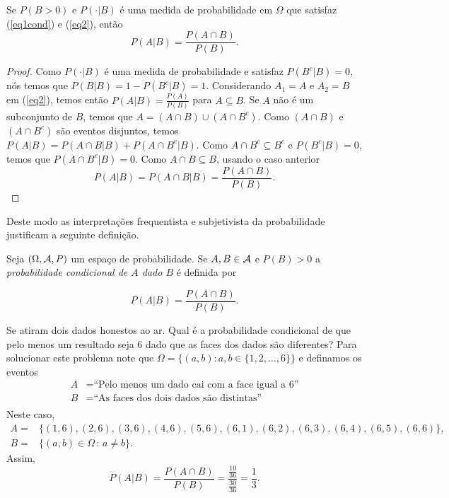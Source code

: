 \begin{frame}

	\begin{theorem}
		Se $P(B>0)$ e $P(\cdot|B)$ é uma medida de probabilidade em $\Omega$
		que satisfaz (\ref{eq1cond}) e (\ref{eq2}), então
		$$P(A|B)=\frac{P(A\cap B)}{P(B)}.$$
	\end{theorem}
	
	\begin{proof} Como $P(\cdot|B)$ é uma medida de probabilidade e satisfaz
	$P(B^c|B)=0$, nós temos que $P(B|B)=1-P(B^c|B)=1$. Considerando
	$A_1=A$ e $A_2=B$ em (\ref{eq2}), temos então
	$P(A|B)=\frac{P(A)}{P(B)}$ para $A\subseteq B$. Se $A$ não é um
	subconjunto de $B$, temos que $A=(A\cap B)\cup (A\cap B^c)$. Como
	$(A\cap B)$ e $(A\cap B^c)$ são eventos disjuntos, temos
	$P(A|B)=P(A\cap B|B)+P(A\cap B^c|B)$. Como $A\cap B^c\subseteq B^c$
	e $P(B^c|B)=0$, temos que $P(A\cap B^c|B)=0$. Como $A\cap B\subseteq
	B$, usando o caso anterior
	$$P(A|B)=P(A\cap B|B)=\frac{P(A\cap B)}{P(B)}.$$
	\end{proof}


Deste modo as interpretações frequentista e subjetivista da
probabilidade justificam a seguinte definição.
	
\end{frame}




\begin{frame}

	
	\begin{defi}
		Seja $(\Omega,{\cal A},P)$ um espaço de probabilidade. Se $A,B\in {\cal A}$ e
		$P(B)>0$ a {\em probabilidade condicional de $A$ dado $B$} é
		definida por
		
		$$P(A|B)=\frac{P(A\cap B)}{P(B)}.$$
	\end{defi}


\begin{exem}
	Se atiram dois dados honestos ao ar. Qual é a probabilidade condicional de que pelo menos um resultado seja 6 dado que as faces dos dados são diferentes? Para solucionar este problema note que $\Omega =\{(a,b):a,b\in \{1,2,\ldots ,6\}\}$ e definamos os eventos 
	$$
	\begin{aligned}
	A &=\text{``Pelo menos um dado cai com a face igual a 6''} \\
	B &=\text{``As faces dos dois dados são distintas''} \\
	\end{aligned}
	$$
	Neste caso, 
	$$
	\begin{aligned}
	A = &\{(1,6),(2,6),(3,6),(4,6),(5,6),(6,1),(6,2),(6,3),(6,4), (6,5),(6,6)\}, \\ 
	B = &\{(a,b) \in \Omega\,:\,a  \neq  b\}.
	\end{aligned}
	$$
	Assim,  $$P(A|B)=\frac{P(A\cap B)}{P(B)}=\frac{\frac{10}{36}}{\frac{30}{36}}= \frac{1}{3}.$$
\end{exem}

\end{frame}

